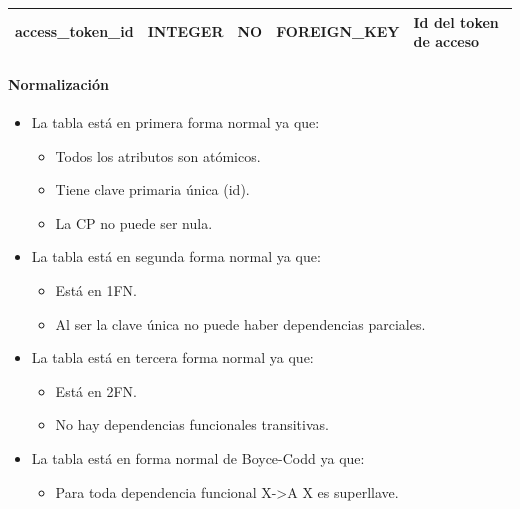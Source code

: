 \documentclass[12pt,a4paperpaper,]{report}
\providecommand{\tightlist}{%
  \setlength{\itemsep}{0pt}\setlength{\parskip}{0pt}}
\let\oldparagraph\paragraph
\renewcommand{\paragraph}[1]{\oldparagraph{#1}\mbox{}}
\begin{document}
\begin{longtable}[]{@{}lllll@{}}
\begin{minipage}[t]{0.21\columnwidth}\raggedright\strut
access\_token\_id\strut
\end{minipage} & \begin{minipage}[t]{0.19\columnwidth}\raggedright\strut
INTEGER\strut
\end{minipage} & \begin{minipage}[t]{0.16\columnwidth}\raggedright\strut
NO\strut
\end{minipage} & \begin{minipage}[t]{0.19\columnwidth}\raggedright\strut
FOREIGN\_KEY\strut
\end{minipage} & \begin{minipage}[t]{0.11\columnwidth}\raggedright\strut
Id del token de acceso\strut
\end{minipage}\tabularnewline
\bottomrule
\end{longtable}

\paragraph{Normalización}\label{normalizaciuxf3n-6}

\begin{itemize}
\tightlist
\item
  La tabla está en primera forma normal ya que:

  \begin{itemize}
  \tightlist
  \item
    Todos los atributos son atómicos.
  \item
    Tiene clave primaria única (id).
  \item
    La CP no puede ser nula.
  \end{itemize}
\item
  La tabla está en segunda forma normal ya que:

  \begin{itemize}
  \tightlist
  \item
    Está en 1FN.
  \item
    Al ser la clave única no puede haber dependencias parciales.
  \end{itemize}
\item
  La tabla está en tercera forma normal ya que:

  \begin{itemize}
  \tightlist
  \item
    Está en 2FN.
  \item
    No hay dependencias funcionales transitivas.
  \end{itemize}
\item
  La tabla está en forma normal de Boyce-Codd ya que:

  \begin{itemize}
  \tightlist
  \item
    Para toda dependencia funcional X-\textgreater{}A X es superllave.
  \end{itemize}
\end{itemize}
\end{document}
